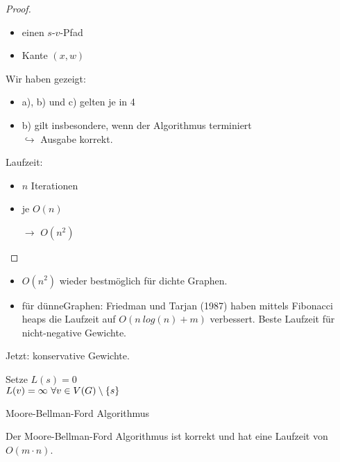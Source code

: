 \begin{proof}
	\begin{itemize}
		\item einen $s$-$v$-Pfad
		\item Kante $(x,w)$
	\end{itemize}
	Wir haben gezeigt:
	\begin{itemize}
		\item a), b) und c) gelten je in 4
		\item b) gilt insbesondere, wenn der Algorithmus terminiert\\
		$\hookrightarrow$ Ausgabe korrekt.
	\end{itemize}
	Laufzeit:
	\begin{itemize}
		\item $n$ Iterationen
		\item je $O(n)$
		\item[$\to$] $O(n^2)$
	\end{itemize}
\end{proof}
\begin{rem}
	\begin{itemize}
		\item $O(n^2)$ wieder bestmöglich für dichte Graphen.
		\item für \dq dünne\dq Graphen: Friedman und Tarjan (1987) haben mittels Fibonacci heaps die Laufzeit auf $O(n~log(n) + m)$ verbessert. Beste Laufzeit für nicht-negative Gewichte.
	\end{itemize}
\end{rem}
Jetzt: konservative Gewichte.
\begin{algorithm}
	\vspace*{5pt}
	Setze $L(s) = 0$\\
	\hspace*{25pt}$L(v) = \infty~\forall v \in V(G)\setminus \{s\}$\\
	\caption{Moore-Bellman-Ford Algorithmus}
	\label{fig:Algorithmus}
\end{algorithm}
\begin{satz}
	Der Moore-Bellman-Ford Algorithmus ist korrekt und hat eine Laufzeit von $O(m\cdot n)$.
\end{satz}
